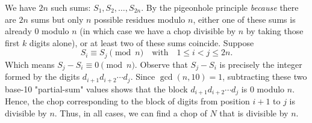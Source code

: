 \documentclass[10pt]{article}
\theoremstyle{plain}
\theoremstyle{definition}
\theoremstyle{remark}
\begin{document}
We have \(2n\) such sums: \(S_1,S_2,\dots,S_{2n}\). By the pigeonhole principle \emph{because} there are \(2n\) sums but only \(n\) possible residues modulo \(n\), either one of these sums is already \(0\) modulo \(n\) (in which case we have a chop divisible by \(n\) by taking those first \(k\) digits alone), or at least two of these sums coincide. Suppose
\[
S_i \equiv S_j \pmod{n}
\quad\text{with}\quad 1 \leqslant i < j \leqslant 2n.
\]
Which means \(S_j - S_i \equiv 0 \pmod{n}.\) Observe that \(S_j - S_i\) is precisely the integer formed by the digits \(d_{i+1}d_{i+2}\cdots d_j\). Since \(\gcd(n,10)=1\), subtracting these two base-10 "partial-sum" values shows that the block \(d_{i+1}d_{i+2}\cdots d_j\) is \(0\) modulo \(n\). Hence, the chop corresponding to the block of digits from position \(i+1\) to \(j\) is divisible by \(n\). Thus, in all cases, we can find a chop of \(N\) that is divisible by \(n\). \square
\end{document}
